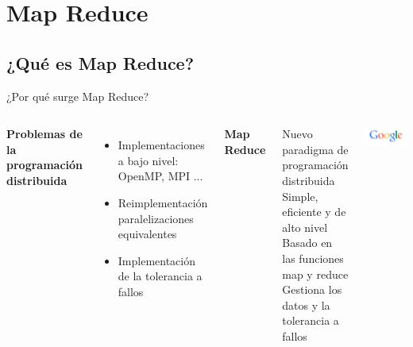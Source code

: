 
\section{Map Reduce}

	\subsection*{¿Qué es Map Reduce?}

		\begin{frame}{¿Por qué surge Map Reduce?}
			
				
			\begin{columns}
					\fontsize{10}{8}\selectfont	
					{\centering\color{TurkishRose}\textbf{Problemas de la programación distribuida}}
					\fontsize{9}{8}\selectfont	
					\begin{itemize}
						\item Implementaciones a bajo nivel: OpenMP, MPI ...
						\item Reimplementación paralelizaciones equivalentes
						\item Implementación de la tolerancia a fallos
					\end{itemize}
					\kern3mm
					\fontsize{10}{8}\selectfont	
					{\centering\color{ChetwodeBlue}\textbf{Map Reduce}}
					\fontsize{9}{8}\selectfont	
					\begin{itemize}
						\MyPitem Nuevo paradigma de programación distribuida
						\MyPitem Simple, eficiente y de alto nivel
						\MyPitem Basado en las funciones map y reduce
						\MyPitem Gestiona los datos y la tolerancia a fallos
					\end{itemize}
				
					\includegraphics[width=\textwidth]{./Images/google.png}
					

\end{columns}
\end{frame}

